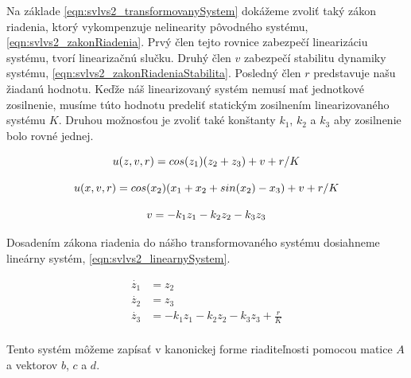 \documentclass[../main.tex]{subfiles}
\begin{document}
Na základe \cref{eqn:svlvs2_transformovanySystem} dokážeme zvoliť taký zákon riadenia, ktorý vykompenzuje nelinearity pôvodného systému,  \cref{eqn:svlvs2_zakonRiadenia}. Prvý člen tejto rovnice zabezpečí linearizáciu systému, tvorí linearizačnú slučku. Druhý člen $v$ zabezpečí stabilitu dynamiky systému, \cref{eqn:svlvs2_zakonRiadeniaStabilita}. Posledný člen $r$ predstavuje našu žiadanú hodnotu. Keďže náš linearizovaný systém nemusí mať jednotkové zosilnenie, musíme túto hodnotu predeliť statickým zosilnením linearizovaného systému $K$. Druhou možnosťou je zvoliť také konštanty $k_1$, $k_2$ a $k_3$ aby zosilnenie bolo rovné jednej.

	\begin{equation}
		u(z,v,r) = cos(z_1)(z_2+z_3) + v + r/K										\\
		\label{eqn:svlvs2_zakonRiadenia}
	\end{equation}

	\begin{equation}
		u(x,v,r) = cos(x_2)(x_1 + x_2+sin(x_2) - x_3) + v + r/K										\\
		\label{eqn:svlvs2_zakonRiadeniaX}
	\end{equation}

	\begin{equation}
		v = -k_1 z_1 - k_2 z_2 -k_3 z_3										\\
		\label{eqn:svlvs2_zakonRiadeniaStabilita}
	\end{equation}

Dosadením zákona riadenia do nášho transformovaného systému dosiahneme lineárny systém, \cref{eqn:svlvs2_linearnySystem}.

	\begin{equation}
		\begin{aligned}
		\dot{z_1} &=  z_2												\\
		\dot{z_2} &=  z_3												\\
		\dot{z_3} &=   -k_1 z_1 - k_2 z_2 -k_3 z_3 + \frac{r}{K}					\\
		\end{aligned}
		\label{eqn:svlvs2_linearnySystem}
	\end{equation}

Tento systém môžeme zapísať v kanonickej forme riaditeľnosti pomocou matice $A$ a vektorov $b$, $c$ a $d$.
\end{document}
